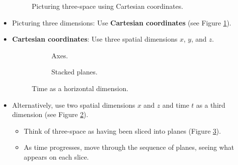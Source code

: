 \documentclass[titlepage]{article}
\numberwithin{figure}{section}
\numberwithin{table}{section}
\numberwithin{equation}{section}
\begin{document}
\begin{itemize}
\begin{figure}[h!]
        \caption{Picturing three-space using Cartesian coordinates.}
        \label{fig:cartesian}
    \end{figure}
    \item Picturing three dimensions: Use \textbf{Cartesian coordinates} (see Figure \ref{fig:cartesian}).
    \item \textbf{Cartesian coordinates}: Use three spatial dimensions $x$, $y$, and $z$.
    \begin{figure}[h!]
        \centering
        \begin{subfigure}[b]{0.3\linewidth}
            \centering
            \caption{Axes.}
            \label{fig:t-horiza}
        \end{subfigure}
        \begin{subfigure}[b]{0.3\linewidth}
            \centering
            \caption{Stacked planes.}
            \label{fig:t-horizb}
        \end{subfigure}
        \caption{Time as a horizontal dimension.}
        \label{fig:t-horiz}
    \end{figure}
    \item Alternatively, use two spatial dimensions $x$ and $z$ and time $t$ as a third dimension (see Figure \ref{fig:t-horiza}).
    \begin{itemize}
        \item Think of three-space as having been sliced into planes (Figure \ref{fig:t-horizb}).
        \item As time progresses, move through the sequence of planes, seeing what appears on each slice.

\end{itemize}
\end{itemize}
\end{document}
